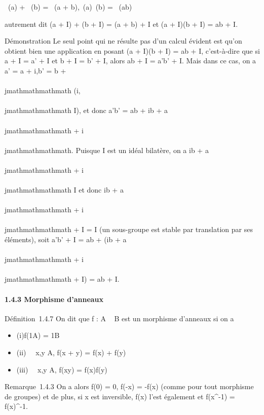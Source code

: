 \pi~(a) + \pi~(b) = \pi~(a + b),\quad \pi~(a)\pi~(b) = \pi~(ab)

autrement dit (a + I) + (b + I) = (a + b) + I et (a + I)(b + I) = ab +
I.

Démonstration Le seul point qui ne résulte pas d'un calcul évident est
qu'on obtient bien une application en posant (a + I)(b + I) = ab + I,
c'est-à-dire que si a + I = a' + I et b + I = b' + I, alors ab + I =
a'b' + I. Mais dans ce cas, on a a' = a + i,b' = b + \\\\jmathmathmathmath (i,\\\\jmathmathmathmath \in I), et
donc a'b' = ab + ib + a\\\\jmathmathmathmath + i\\\\jmathmathmathmath. Puisque I est un idéal bilatère, on a ib
+ a\\\\jmathmathmathmath + i\\\\jmathmathmathmath \in I et donc ib + a\\\\jmathmathmathmath + i\\\\jmathmathmathmath + I = I (un sous-groupe est stable
par translation par ses éléments), soit a'b' + I = ab + (ib + a\\\\jmathmathmathmath + i\\\\jmathmathmathmath +
I) = ab + I.

\paragraph{1.4.3 Morphisme d'anneaux}

Définition~1.4.7 On dit que f : A \rightarrow~ B est un morphisme d'anneaux si on a

\begin{itemize}
\itemsep1pt\parskip0pt
\item
  (i)f(1A) = 1B
\item
  (ii) \forall~~x,y \in A, f(x + y) = f(x) + f(y)
\item
  (iii) \forall~~x,y \in A, f(xy) = f(x)f(y)
\end{itemize}

Remarque~1.4.3 On a alors f(0) = 0, f(-x) = -f(x) (comme pour tout
morphisme de groupes) et de plus, si x est inversible, f(x) l'est
également et f(x^-1) = f(x)^-1.

